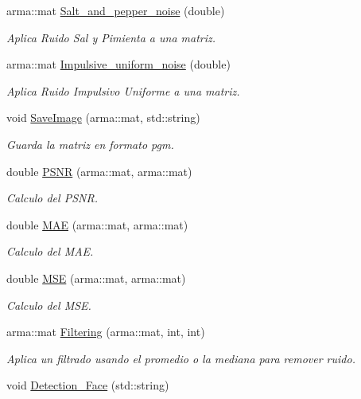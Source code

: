 \begin{DoxyCompactItemize}
arma::mat \hyperlink{classImage_a05c18284cc5906a249ca055e35f98037}{Salt\_\-and\_\-pepper\_\-noise} (double)
\begin{DoxyCompactList}\small\item\em Aplica Ruido Sal y Pimienta a una matriz. \end{DoxyCompactList}\item 
arma::mat \hyperlink{classImage_ac33563552d3b003151122a2070e39540}{Impulsive\_\-uniform\_\-noise} (double)
\begin{DoxyCompactList}\small\item\em Aplica Ruido Impulsivo Uniforme a una matriz. \end{DoxyCompactList}\item 
void \hyperlink{classImage_a3203c7c554c580a3c08755bb43d5b048}{SaveImage} (arma::mat, std::string)
\begin{DoxyCompactList}\small\item\em Guarda la matriz en formato pgm. \end{DoxyCompactList}\item 
double \hyperlink{classImage_a0a7f491ee408027a11cc0551fb4dedbd}{PSNR} (arma::mat, arma::mat)
\begin{DoxyCompactList}\small\item\em Calculo del PSNR. \end{DoxyCompactList}\item 
double \hyperlink{classImage_ac2bfdd46c739cf12e1a9c19635ee1acc}{MAE} (arma::mat, arma::mat)
\begin{DoxyCompactList}\small\item\em Calculo del MAE. \end{DoxyCompactList}\item 
double \hyperlink{classImage_a724ca0afc83c93fa43bccd1802c6bd81}{MSE} (arma::mat, arma::mat)
\begin{DoxyCompactList}\small\item\em Calculo del MSE. \end{DoxyCompactList}\item 
arma::mat \hyperlink{classImage_ad8b8a074b29c240d791859b2b4f7115a}{Filtering} (arma::mat, int, int)
\begin{DoxyCompactList}\small\item\em Aplica un filtrado usando el promedio o la mediana para remover ruido. \end{DoxyCompactList}\item 
void \hyperlink{classImage_a150d4add6a8f7e926a7bc32ccf875169}{Detection\_\-Face} (std::string)

\end{DoxyCompactItemize}
